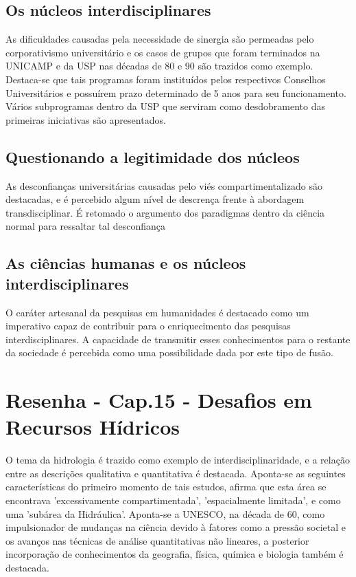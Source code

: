 \documentclass[
   article,       %
   12pt,          %
   oneside,       %
   a4paper,       %
   english,       %
   brazil,           %
   sumario=tradicional
   ]{abntex2}
\begin{document}
\subsection{Os núcleos interdisciplinares}

As dificuldades causadas pela necessidade de sinergia são permeadas pelo corporativismo universitário e os casos de grupos que foram terminados na UNICAMP e da USP nas décadas de 80 e 90 são trazidos como exemplo. Destaca-se que tais programas foram instituídos pelos respectivos Conselhos Universitários e possuírem prazo determinado de 5 anos para seu funcionamento. Vários subprogramas dentro da USP que serviram como desdobramento das primeiras iniciativas são apresentados.


\subsection{Questionando a legitimidade dos núcleos}

As desconfianças universitárias causadas pelo viés compartimentalizado são destacadas, e é percebido algum nível de descrença frente à abordagem transdisciplinar. É retomado o argumento dos paradigmas dentro da ciência normal para ressaltar tal desconfiança


\subsection{As ciências humanas e os núcleos interdisciplinares}

O caráter artesanal da pesquisas em humanidades é destacado como um imperativo capaz de contribuir para o enriquecimento das pesquisas interdisciplinares. A capacidade de transmitir esses conhecimentos para o restante da sociedade é percebida como uma possibilidade dada por este tipo de fusão.





\newpage

\section{Resenha - Cap.15 - Desafios em Recursos Hídricos}

O tema da hidrologia é trazido como exemplo de interdisciplinaridade, e a relação entre as descrições qualitativa e quantitativa é destacada. Aponta-se as seguintes características do primeiro momento de tais estudos, \cite[p.254]{Interdisciplinaridade_Hidricos} afirma que esta área se encontrava 'excessivamente compartimentada', 'espacialmente limitada', e como uma 'subárea da Hidráulica'. Aponta-se a UNESCO, na década de 60, como impulsionador de mudanças na ciência devido à fatores como a pressão societal e os avanços nas técnicas de análise quantitativas não lineares, a posterior incorporação de conhecimentos da geografia, física, química e biologia também é destacada.
\end{document}
